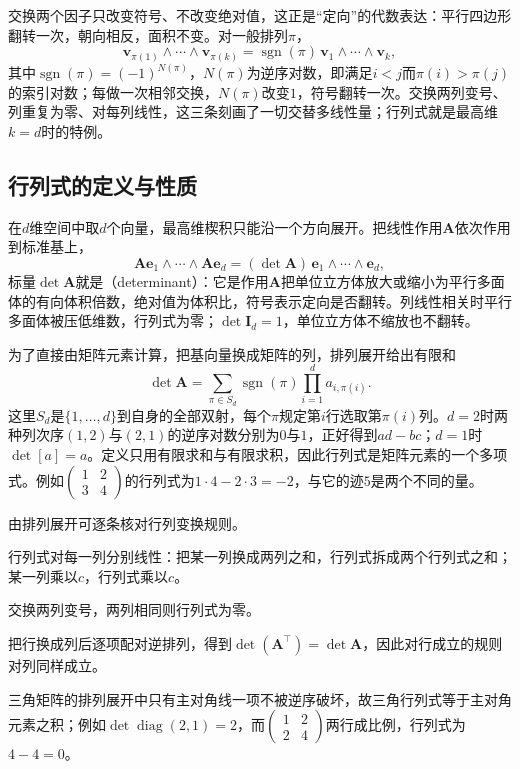 交换两个因子只改变符号、不改变绝对值，这正是“定向”的代数表达：平行四边形翻转一次，朝向相反，面积不变。对一般排列$\pi$，
\[
 \bm v_{\pi(1)}\wedge\cdots\wedge\bm v_{\pi(k)}
 =\operatorname{sgn}(\pi)\,\bm v_1\wedge\cdots\wedge\bm v_k,
\]
其中$\operatorname{sgn}(\pi)=(-1)^{N(\pi)}$，$N(\pi)$为逆序对数，即满足$i<j$而$\pi(i)>\pi(j)$的索引对数；每做一次相邻交换，$N(\pi)$改变$1$，符号翻转一次。交换两列变号、列重复为零、对每列线性，这三条刻画了一切交替多线性量；行列式就是最高维$k=d$时的特例。

\subsection{行列式的定义与性质}
\label{sec:ls-determinant-properties}
\label{sec:prelim-determinants}

在$d$维空间中取$d$个向量，最高维楔积只能沿一个方向展开。把线性作用$\bm A$依次作用到标准基上，
\[
 \bm A\bm e_1\wedge\cdots\wedge\bm A\bm e_d
 =(\det\bm A)\,\bm e_1\wedge\cdots\wedge\bm e_d,
\]
标量$\det\bm A$就是（determinant）：它是作用$\bm A$把单位立方体放大或缩小为平行多面体的有向体积倍数，绝对值为体积比，符号表示定向是否翻转。列线性相关时平行多面体被压低维数，行列式为零；$\det\bm I_d=1$，单位立方体不缩放也不翻转。

为了直接由矩阵元素计算，把基向量换成矩阵的列，排列展开给出有限和
\[
 \det\bm A
 =\sum_{\pi\in S_d}\operatorname{sgn}(\pi)
   \prod_{i=1}^d a_{i,\pi(i)}.
\]
这里$S_d$是$\{1,\ldots,d\}$到自身的全部双射，每个$\pi$规定第$i$行选取第$\pi(i)$列。$d=2$时两种列次序$(1,2)$与$(2,1)$的逆序对数分别为$0$与$1$，正好得到$ad-bc$；$d=1$时$\det[a]=a$。定义只用有限求和与有限求积，因此行列式是矩阵元素的一个多项式。例如$\begin{pmatrix}1&2\\3&4\end{pmatrix}$的行列式为$1\cdot4-2\cdot3=-2$，与它的迹$5$是两个不同的量。

由排列展开可逐条核对行列变换规则。

行列式对每一列分别线性：把某一列换成两列之和，行列式拆成两个行列式之和；某一列乘以$c$，行列式乘以$c$。

交换两列变号，两列相同则行列式为零。

把行换成列后逐项配对逆排列，得到$\det(\bm A^\top)=\det\bm A$，因此对行成立的规则对列同样成立。

三角矩阵的排列展开中只有主对角线一项不被逆序破坏，故三角行列式等于主对角元素之积；例如$\det\operatorname{diag}(2,1)=2$，而$\begin{pmatrix}1&2\\2&4\end{pmatrix}$两行成比例，行列式为$4-4=0$。


